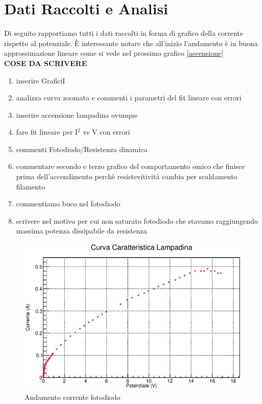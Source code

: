 \documentclass[a4paper]{article}
\begin{document}
\newpage
\section{Dati Raccolti e Analisi}
Di seguito rapportiamo tutti i dati raccolti in forma di grafico della corrente rispetto al potenziale. È interessante notare che all'inizio l'andamento è in buona approssimazione lineare come si vede nel prossimo grafico \ref{accensione}\\

\textbf{\huge{COSE DA SCRIVERE}}
\begin{enumerate}
   \item inserire GraficiI
   \item analizza curva zoomata e commenti i parametri del fit lineare con errori 
   \item inserire accensione lampadina ovunque
   \item fare fit lineare per I$^2$ vs V con errori
   \item commenti Fotodiodo/Resistenza dinamica
   \item commentare secondo e terzo grafico del comportamento omico che finisce prima dell'accendimento perchè resistevitività cambia per scaldamento filamento
   \item commentiamo buco nel fotodiodo
   \item scrivere nel motivo per cui non saturato fotodiodo che stavamo raggiungendo massima potenza dissipabile da resistenza
\end{enumerate}

\begin{figure}[!htbp]
      \includegraphics[width=\textwidth]{immagini/bruciarelampa.eps}
        \caption{Andamento corrente fotodiodo}
\end{figure}
\FloatBarrier
\end{document}
